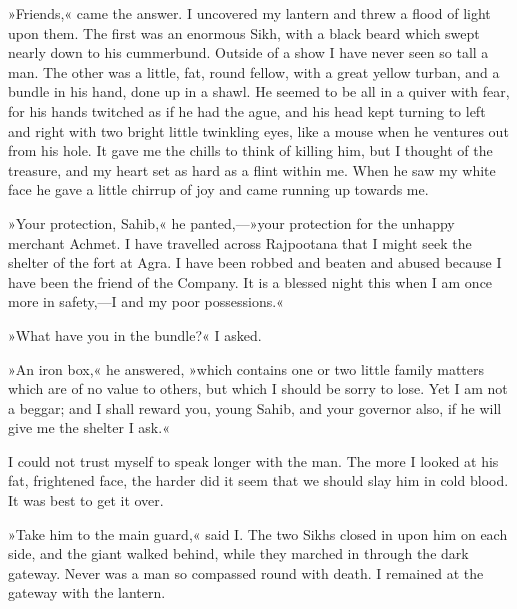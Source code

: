 »Friends,« came the answer. I uncovered my lantern and threw a flood of light upon them. The first was an enormous Sikh, with a black beard which swept nearly down to his cummerbund. Outside of a show I have never seen so tall a man. The other was a little, fat, round fellow, with a great yellow turban, and a bundle in his hand, done up in a shawl. He seemed to be all in a quiver with fear, for his hands twitched as if he had the ague, and his head kept turning to left and right with two bright little twinkling eyes, like a mouse when he ventures out from his hole. It gave me the chills to think of killing him, but I thought of the treasure, and my heart set as hard as a flint within me. When he saw my white face he gave a little chirrup of joy and came running up towards me.

»Your protection, Sahib,« he panted,—»your protection for the unhappy merchant Achmet. I have travelled across Rajpootana that I might seek the shelter of the fort at Agra. I have been robbed and beaten and abused because I have been the friend of the Company. It is a blessed night this when I am once more in safety,—I and my poor possessions.«

»What have you in the bundle?« I asked.

»An iron box,« he answered, »which contains one or two little family matters which are of no value to others, but which I should be sorry to lose. Yet I am not a beggar; and I shall reward you, young Sahib, and your governor also, if he will give me the shelter I ask.«

I could not trust myself to speak longer with the man. The more I looked at his fat, frightened face, the harder did it seem that we should slay him in cold blood. It was best to get it over.

»Take him to the main guard,« said I. The two Sikhs closed in upon him on each side, and the giant walked behind, while they marched in through the dark gateway. Never was a man so compassed round with death. I remained at the gateway with the lantern.

